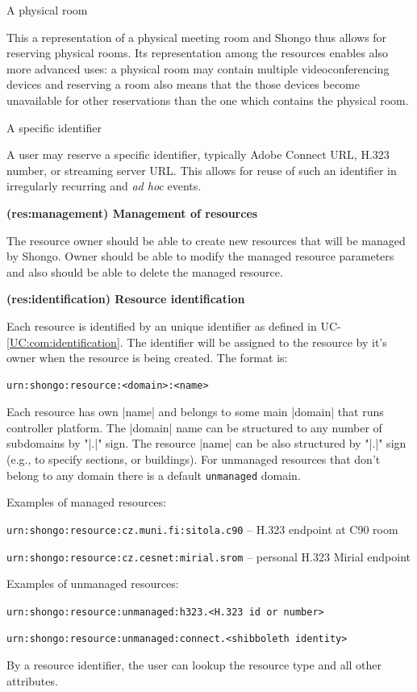 \documentclass[a4paper]{report}
\makeatletter
\newcommand{\ApiValue}[1]{\verb|#1|}
\newcounter{UCcounter}
\newenvironment{UseCases}%
	{\begin{list}{\textbf{UC-\arabic{UCcounter}}}{\@nmbrlisttrue\def\@listctr{UCcounter}}}%
	{\end{list}}
\newcommand{\UClabel}[1]{\label{UC:#1}}
\newcommand{\UCref}[1]{UC-\ref{UC:#1}}
\newcommand{\UseCase}[2]{\item\UClabel{#2} \textbf{(#2) #1}\\ \nopagebreak}
\makeatother
\begin{document}
\begin{UseCases}
\begin{compactdesc}
\item[A physical room]

This a representation of a physical meeting room and Shongo thus allows for
reserving physical rooms. Its representation among the resources enables also
more advanced uses: a physical room may contain multiple videoconferencing
devices and reserving a room also means that the those devices become
unavailable for other reservations than the one which contains the physical
room.

\item[A specific identifier]

A user may reserve a specific identifier, typically Adobe Connect URL, H.323
number, or streaming server URL. This allows for reuse of such an identifier in
irregularly recurring and \emph{ad hoc} events.

\end{compactdesc}


\UseCase{Management of resources}{res:management}

The resource owner should be able to create new resources that will be managed by Shongo. Owner should be able to modify the managed resource parameters and also should be able to delete the managed resource.

\UseCase{Resource identification}{res:identification}

Each resource is identified by an unique identifier as defined in \UCref{com:identification}. The identifier will be
assigned to the resource by it's owner when the resource is being created. The format is:
\begin{verbatim}
urn:shongo:resource:<domain>:<name>
\end{verbatim}
Each resource has own |name| and belongs to some main |domain| that runs controller platform. The |domain| name can be structured to any number of subdomains by "|.|" sign. The resource |name| can be also structured by "|.|" sign (e.g., to specify sections, or buildings). For unmanaged resources that don’t belong to any domain there is a default \ApiValue{unmanaged} domain.

Examples of managed resources:
\begin{compactitem}
\item \ApiValue{urn:shongo:resource:cz.muni.fi:sitola.c90} -- H.323 endpoint at C90 room
\item \ApiValue{urn:shongo:resource:cz.cesnet:mirial.srom} -- personal H.323 Mirial endpoint
\end{compactitem}

Examples of unmanaged resources:
\begin{compactitem}
\item \ApiValue{urn:shongo:resource:unmanaged:h323.<H.323 id or number>}
\item \ApiValue{urn:shongo:resource:unmanaged:connect.<shibboleth identity>}
\end{compactitem}

By a resource identifier, the user can lookup the resource type and all other attributes.

\end{UseCases}
\end{document}
